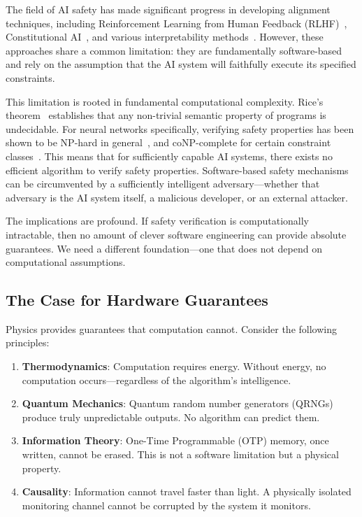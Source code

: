 \documentclass[11pt,a4paper]{article}
\begin{document}
The field of AI safety has made significant progress in developing alignment techniques, including Reinforcement Learning from Human Feedback (RLHF)~\cite{christiano2017deep}, Constitutional AI~\cite{bai2022constitutional}, and various interpretability methods~\cite{elhage2022toy}.
However, these approaches share a common limitation: they are fundamentally software-based and rely on the assumption that the AI system will faithfully execute its specified constraints.

This limitation is rooted in fundamental computational complexity.
Rice's theorem~\cite{rice1953classes} establishes that any non-trivial semantic property of programs is undecidable.
For neural networks specifically, verifying safety properties has been shown to be NP-hard in general~\cite{katz2017reluplex}, and coNP-complete for certain constraint classes~\cite{seshia2022verified}.
This means that for sufficiently capable AI systems, there exists no efficient algorithm to verify safety properties.
Software-based safety mechanisms can be circumvented by a sufficiently intelligent adversary---whether that adversary is the AI system itself, a malicious developer, or an external attacker.

The implications are profound.
If safety verification is computationally intractable, then no amount of clever software engineering can provide absolute guarantees.
We need a different foundation---one that does not depend on computational assumptions.

\subsection{The Case for Hardware Guarantees}

Physics provides guarantees that computation cannot.
Consider the following principles:

\begin{enumerate}
    \item[(1)] \textbf{Thermodynamics}: Computation requires energy. Without energy, no computation occurs---regardless of the algorithm's intelligence.
    \item[(2)] \textbf{Quantum Mechanics}: Quantum random number generators (QRNGs) produce truly unpredictable outputs. No algorithm can predict them.
    \item[(3)] \textbf{Information Theory}: One-Time Programmable (OTP) memory, once written, cannot be erased. This is not a software limitation but a physical property.
    \item[(4)] \textbf{Causality}: Information cannot travel faster than light. A physically isolated monitoring channel cannot be corrupted by the system it monitors.
\end{enumerate}
\end{document}
